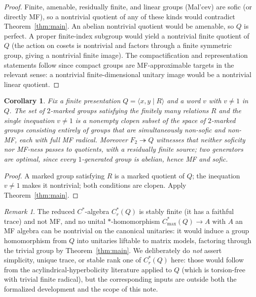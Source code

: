 \documentclass[11pt]{amsart}
\newtheorem{corollary}[theorem]{Corollary}
\theoremstyle{remark}
\newtheorem{remark}[theorem]{Remark}
\theoremstyle{definition}
\begin{document}
\begin{proof}
Finite, amenable, residually finite, and linear groups (Mal'cev) are sofic
(or directly MF), so a nontrivial quotient of any of these kinds would
contradict Theorem~\ref{thm:main}.  An abelian nontrivial quotient would be
amenable, so $Q$ is perfect.  A proper finite-index subgroup would yield a
nontrivial finite quotient of $Q$ (the action on cosets is nontrivial and
factors through a finite symmetric group, giving a nontrivial finite image).
The compactification and representation statements follow since compact
groups are MF-approximable targets in the relevant sense: a nontrivial
finite-dimensional unitary image would be a nontrivial linear quotient.
\end{proof}

\begin{corollary}\label{cor:marked}
Fix a finite presentation $Q=\langle x,y\mid R\rangle$ and a word $v$ with
$v\neq1$ in $Q$.  The set of $2$-marked groups satisfying the finitely many
relations $R$ and the single inequation $v\neq1$ is a nonempty clopen subset
of the space of $2$-marked groups consisting entirely of groups that are
simultaneously non-sofic and non-MF, each with full MF radical.
Moreover $F_2\twoheadrightarrow Q$ witnesses that neither soficity nor
MF-ness passes to quotients, with a residually finite source; two generators
are optimal, since every $1$-generated group is abelian, hence MF and sofic.
\end{corollary}

\begin{proof}
A marked group satisfying $R$ is a marked quotient of $Q$; the inequation
$v\neq1$ makes it nontrivial; both conditions are clopen.  Apply
Theorem~\ref{thm:main}.
\end{proof}

\begin{remark}
The reduced $C^*$-algebra $C^*_r(Q)$ is stably finite (it has a faithful
trace) and not MF, and no unital $*$-homomorphism
$C^*_{\max}(Q)\to A$ with $A$ an MF algebra can be nontrivial on the
canonical unitaries: it would induce a group homomorphism from $Q$ into
unitaries liftable to matrix models, factoring through the trivial group by
Theorem~\ref{thm:main}.  We deliberately do \emph{not} assert simplicity,
unique trace, or stable rank one of $C^*_r(Q)$ here: those would follow from
the acylindrical-hyperbolicity literature applied to $Q$ (which is
torsion-free with trivial finite radical), but the corresponding inputs are
outside both the formalized development and the scope of this note.
\end{remark}
\end{document}
